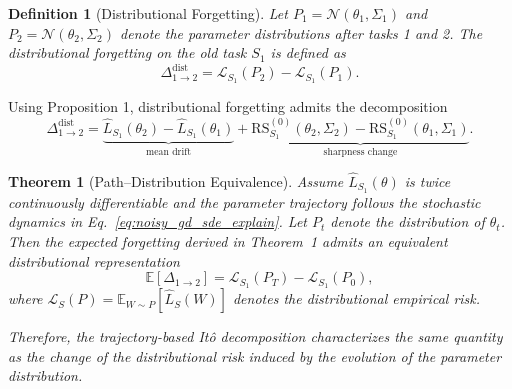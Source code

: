 \documentclass{article}
\newtheorem{definition}{Definition}  %
\newtheorem{theorem}{Theorem}
\begin{document}
\begin{definition}[Distributional Forgetting]
Let $P_1=\mathcal N(\theta_1,\Sigma_1)$ and $P_2=\mathcal N(\theta_2,\Sigma_2)$ denote the parameter distributions after tasks 1 and 2. 
The distributional forgetting on the old task $S_1$ is defined as
\begin{equation}
\Delta_{1\rightarrow2}^{\mathrm{dist}}
=
\mathcal L_{S_1}(P_2)
-
\mathcal L_{S_1}(P_1).
\end{equation}
\end{definition}

Using Proposition 1, distributional forgetting admits the decomposition
\begin{equation}
\Delta_{1\rightarrow2}^{\mathrm{dist}}
=
\underbrace{
\hat L_{S_1}(\theta_2)-\hat L_{S_1}(\theta_1)
}_{\text{mean drift}}
+
\underbrace{
\mathrm{RS}_{S_1}^{(0)}(\theta_2,\Sigma_2)
-
\mathrm{RS}_{S_1}^{(0)}(\theta_1,\Sigma_1)
}_{\text{sharpness change}} .
\end{equation}

\begin{theorem}[Path--Distribution Equivalence]
Assume $\hat L_{S_1}(\theta)$ is twice continuously differentiable and the parameter trajectory follows the stochastic dynamics in Eq.~\eqref{eq:noisy_gd_sde_explain}.  
Let $P_t$ denote the distribution of $\theta_t$.
Then the expected forgetting derived in Theorem~1 admits an equivalent distributional representation
\begin{equation}
\mathbb E[\Delta_{1\rightarrow2}]
=
\mathcal L_{S_1}(P_T)
-
\mathcal L_{S_1}(P_0),
\end{equation}
where $\mathcal L_S(P)=\mathbb E_{W\sim P}[\hat L_S(W)]$ denotes the distributional empirical risk.

Therefore, the trajectory-based It\^{o} decomposition characterizes the same quantity as the change of the distributional risk induced by the evolution of the parameter distribution.
\end{theorem}











\end{document}
